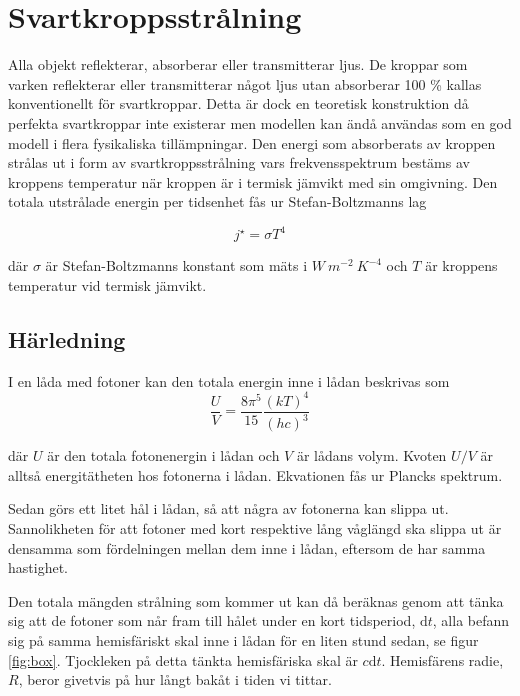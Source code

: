 \section{Svartkroppsstrålning}
\label{sec:blackbody}

Alla objekt reflekterar, absorberar eller transmitterar ljus. De kroppar som varken 
reflekterar eller transmitterar något ljus utan absorberar 100 \% kallas konventionellt för svartkroppar. Detta är dock en teoretisk konstruktion då perfekta svartkroppar inte existerar men modellen kan ändå användas som en god modell i flera fysikaliska 
tillämpningar. Den energi som absorberats av kroppen strålas ut i form av svartkroppsstrålning vars 
frekvensspektrum bestäms av kroppens temperatur när kroppen är i termisk jämvikt med
 sin omgivning. Den totala utstrålade energin per tidsenhet fås ur Stefan-Boltzmanns lag
 
\begin{equation}
\label{eq:boltzmanslag}
\boxed{ \; \; \;
j^{\star} = \sigma T^{4}
\; \; \; }
\end{equation}

\noindent
där $\sigma$ är Stefan-Boltzmanns konstant som mäts i $\unit{W~m^{-2}~K^{-4}}$ och $T$ är kroppens temperatur vid termisk jämvikt.

\subsection{Härledning}
I en låda med fotoner kan den totala energin inne i lådan beskrivas som 
\begin{equation}
\label{eq:photonbox}
\frac{U}{V}=\frac{8\pi^5}{15}\frac{(kT)^4}{(hc)^3}
\end{equation}

där $U$ är den totala fotonenergin i lådan och $V$ är lådans volym. Kvoten $U/V$ är alltså energitätheten hos fotonerna i lådan. Ekvationen fås ur Plancks spektrum.\cite[ss.~292,~301-302]{schroeder00} %

Sedan görs ett litet hål i lådan, så att några av fotonerna kan slippa ut. Sannolikheten för att fotoner med kort respektive lång våglängd ska slippa ut är densamma som fördelningen mellan dem inne i lådan, eftersom de har samma hastighet.

Den totala mängden strålning som kommer ut kan då beräknas genom att tänka sig att 
de fotoner som når fram till hålet under en kort tidsperiod, $\mathrm{d}t$, alla befann sig
 på samma hemisfäriskt skal inne i lådan för en liten stund sedan, se figur \ref{fig:box}. Tjockleken på detta tänkta hemisfäriska skal är $c\mathrm{d}t$. Hemisfärens radie, $R$, beror givetvis på hur långt bakåt i tiden vi tittar.

